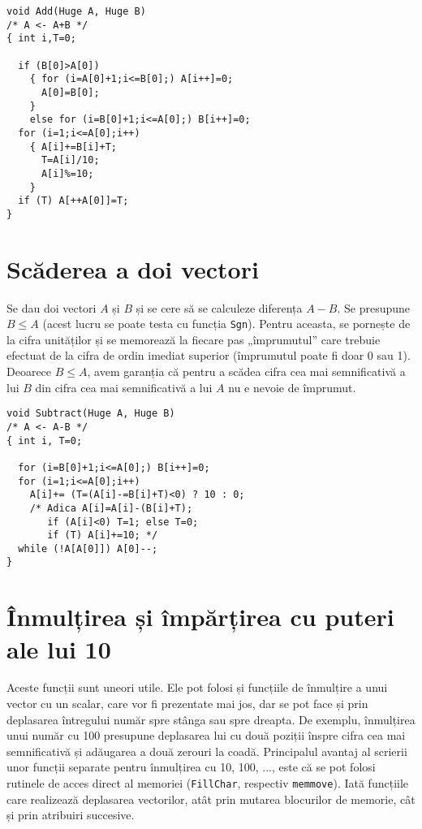 \begin{verbatim}
void Add(Huge A, Huge B)
/* A <- A+B */
{ int i,T=0;

  if (B[0]>A[0])
    { for (i=A[0]+1;i<=B[0];) A[i++]=0;
      A[0]=B[0];
    }
    else for (i=B[0]+1;i<=A[0];) B[i++]=0;
  for (i=1;i<=A[0];i++)
    { A[i]+=B[i]+T;
      T=A[i]/10;
      A[i]%=10;
    }
  if (T) A[++A[0]]=T;
}
\end{verbatim}

\section{Scăderea a doi vectori}

Se dau doi vectori $A$ și $B$ și se cere să se calculeze diferența $A - B$. Se
presupune $B \leq A$ (acest lucru se poate testa cu funcția {\tt Sgn}). Pentru
aceasta, se pornește de la cifra unităților și se memorează la fiecare pas
„împrumutul” care trebuie efectuat de la cifra de ordin imediat superior
(împrumutul poate fi doar 0 sau 1). Deoarece $B \leq A$, avem garanția că
pentru a scădea cifra cea mai semnificativă a lui $B$ din cifra cea mai
semnificativă a lui $A$ nu e nevoie de împrumut.

\begin{verbatim}
void Subtract(Huge A, Huge B)
/* A <- A-B */
{ int i, T=0;

  for (i=B[0]+1;i<=A[0];) B[i++]=0;
  for (i=1;i<=A[0];i++)
    A[i]+= (T=(A[i]-=B[i]+T)<0) ? 10 : 0;
    /* Adica A[i]=A[i]-(B[i]+T);
       if (A[i]<0) T=1; else T=0;
       if (T) A[i]+=10; */
  while (!A[A[0]]) A[0]--;
}
\end{verbatim}

\section{Înmulțirea și împărțirea cu puteri ale lui 10}

Aceste funcții sunt uneori utile. Ele pot folosi și funcțiile de înmulțire a
unui vector cu un scalar, care vor fi prezentate mai jos, dar se pot face și
prin deplasarea întregului număr spre stânga sau spre dreapta. De exemplu,
înmulțirea unui număr cu 100 presupune deplasarea lui cu două poziții înspre
cifra cea mai semnificativă și adăugarea a două zerouri la coadă. Principalul
avantaj al scrierii unor funcții separate pentru înmulțirea cu 10, 100, ...,
este că se pot folosi rutinele de acces direct al memoriei ({\tt FillChar},
respectiv {\tt memmove}). Iată funcțiile care realizează deplasarea
vectorilor, atât prin mutarea blocurilor de memorie, cât și prin atribuiri
succesive.

